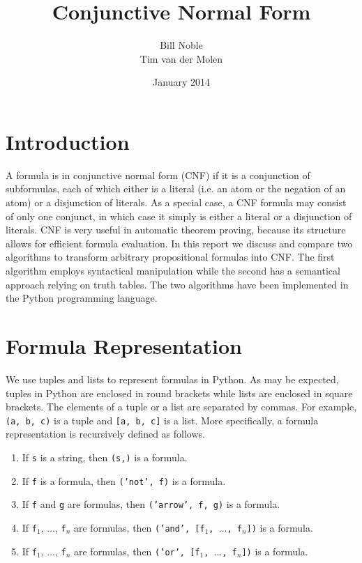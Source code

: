 \documentclass[a4paper,notitlepage]{scrartcl}
\title{Conjunctive Normal Form}
\author{Bill Noble\\ Tim van der Molen}
\date{January 2014}
\begin{document}
\maketitle

\section{Introduction}

A formula is in conjunctive normal form (CNF) if it is a conjunction of
subformulas, each of which either is a literal (i.e. an atom or the negation of
an atom) or a disjunction of literals.
As a special case, a CNF formula may consist of only one conjunct, in which
case it simply is either a literal or a disjunction of literals. 
CNF is very useful in automatic theorem proving, because its structure allows
for efficient formula evaluation.
In this report we discuss and compare two algorithms to transform arbitrary
propositional formulas into CNF.
The first algorithm employs syntactical manipulation while the second has a
semantical approach relying on truth tables.
The two algorithms have been implemented in the Python programming language.

\section{Formula Representation}

We use tuples and lists to represent formulas in Python.
As may be expected, tuples in Python are enclosed in round brackets while lists
are enclosed in square brackets.
The elements of a tuple or a list are separated by commas.
For example, \texttt{(a, b, c)} is a tuple and \texttt{[a, b, c]} is a list.
More specifically, a formula representation is recursively defined as follows.

\begin{enumerate}

\item
If \texttt{s} is a string, then \texttt{(s,)} is a formula.

\item
If \texttt{f} is a formula, then \texttt{('not', f)} is a formula.

\item
If \texttt{f} and \texttt{g} are formulas, then \texttt{('arrow', f, g)} is a
formula.

\item
If \texttt{f}$_1$, $\ldots$, \texttt{f}$_n$ are formulas, then \texttt{('and',
[f$_1$, $\ldots$, f$_n$])} is a formula.

\item
If \texttt{f}$_1$, $\ldots$, \texttt{f}$_n$ are formulas, then \texttt{('or',
[f$_1$, $\ldots$, f$_n$])} is a formula.
\end{enumerate}
\end{document}
